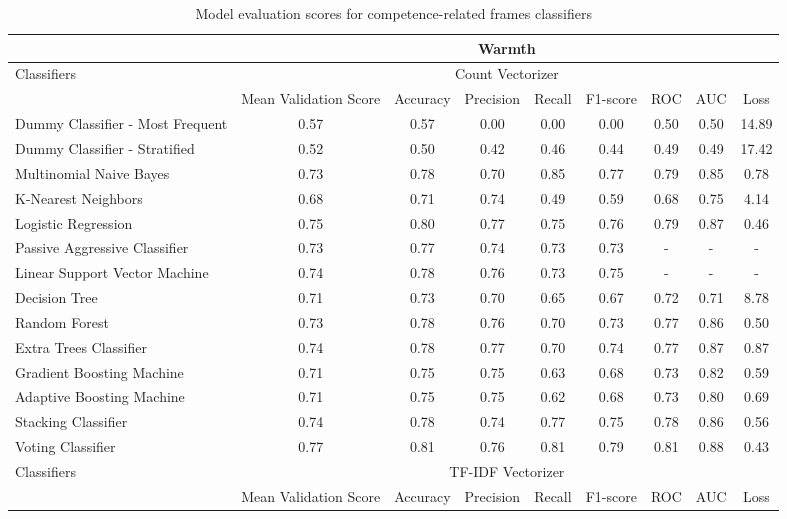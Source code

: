 \documentclass[jou]{apa7}
\begin{document}
\begin{landscape}
    \begin{longtable}[l]{lcccccccc}
    \caption{Model evaluation scores for competence-related frames classifiers}
    \label{table11}
    \hline
    & \multicolumn{8}{c}{Warmth} \\ \hline
    \endhead
    \multirow{2}{*}{Classifiers} & \multicolumn{8}{c}{Count Vectorizer} \\ \cline{2-9}
    & Mean   Validation Score & Accuracy & Precision & Recall & F1-score & ROC & AUC & Loss \\ \hline
    Dummy Classifier - Most   Frequent & 0.57 & 0.57 & 0.00 & 0.00 & 0.00 & 0.50 & 0.50 & 14.89 \\
    Dummy Classifier - Stratified & 0.52 & 0.50 & 0.42 & 0.46 & 0.44 & 0.49 & 0.49 & 17.42 \\
    Multinomial Naive Bayes & 0.73 & 0.78 & 0.70 & 0.85 & 0.77 & 0.79 & 0.85 & 0.78 \\
    K-Nearest Neighbors & 0.68 & 0.71 & 0.74 & 0.49 & 0.59 & 0.68 & 0.75 & 4.14 \\
    Logistic Regression & 0.75 & 0.80 & 0.77 & 0.75 & 0.76 & 0.79 & 0.87 & 0.46 \\
    Passive Aggressive Classifier & 0.73 & 0.77 & 0.74 & 0.73 & 0.73 & - & - & - \\
    Linear Support Vector Machine & 0.74 & 0.78 & 0.76 & 0.73 & 0.75 & - & - & - \\
    Decision Tree & 0.71 & 0.73 & 0.70 & 0.65 & 0.67 & 0.72 & 0.71 & 8.78 \\
    Random Forest & 0.73 & 0.78 & 0.76 & 0.70 & 0.73 & 0.77 & 0.86 & 0.50 \\
    Extra Trees Classifier & 0.74 & 0.78 & 0.77 & 0.70 & 0.74 & 0.77 & 0.87 & 0.87 \\
    Gradient Boosting Machine & 0.71 & 0.75 & 0.75 & 0.63 & 0.68 & 0.73 & 0.82 & 0.59 \\
    Adaptive Boosting Machine & 0.71 & 0.75 & 0.75 & 0.62 & 0.68 & 0.73 & 0.80 & 0.69 \\
    Stacking Classifier & 0.74 & 0.78 & 0.74 & 0.77 & 0.75 & 0.78 & 0.86 & 0.56 \\
    Voting Classifier & 0.77 & 0.81 & 0.76 & 0.81 & 0.79 & 0.81 & 0.88 & 0.43 \\ \hline
    \multirow{2}{*}{Classifiers} & \multicolumn{8}{c}{TF-IDF Vectorizer} \\ \cline{2-9}
    & Mean   Validation Score & Accuracy & Precision & Recall & F1-score & ROC & AUC & Loss \\ \hline

\end{longtable}
\end{landscape}
\end{document}

